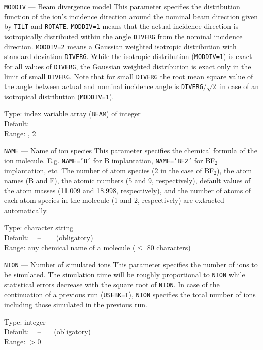 \begin{keydescription}{\texttt{MODDIV} --- Beam divergence model}
%
  This parameter specifies the distribution function of the ion's
  incidence direction around the nominal beam direction given by
  \texttt{TILT} and \texttt{ROTATE}. \texttt{MODDIV=1} means that the
  actual incidence direction is isotropically distributed within the
  angle \texttt{DIVERG} from the nominal incidence direction.
  \texttt{MODDIV=2} means a Gaussian weighted isotropic distribution 
  with standard deviation \texttt{DIVERG}. While the isotropic distribution 
  (\texttt{MODDIV=1}) is exact for all values of \texttt{DIVERG}, the Gaussian
  weighted distribution is exact only in the limit of small \texttt{DIVERG}.
  Note that for small \texttt{DIVERG} the root mean square value of the angle
  between actual and nominal incidence angle is \texttt{DIVERG}$/\sqrt{2}$ in 
  case of an isotropical distribution (\texttt{MODDIV=1}).
%
  \begin{keytab}
    Type:    \> index variable array (\texttt{BEAM}) of integer \\
    Default:  \\
    Range:   , 2
  \end{keytab}
\end{keydescription}

\begin{keydescription}{\texttt{NAME} --- Name of ion species}
%
  This parameter specifies the chemical formula of the ion molecule.
  E.g. \texttt{NAME='B'} for B implantation, \texttt{NAME='BF2'} for
  BF$_2$ implantation, etc.  The number of atom species (2 in the case
  of BF$_2$), the atom names (B and F), the atomic numbers (5 and 9,
  respectively), default values of the atom masses (11.009 and 18.998,
  respectively), and the number of atoms of each atom species in the
  molecule (1 and 2, respectively) are extracted automatically.
%
  \begin{keytab}
    Type:    \> character string \\
    Default: \> ~ -- ~~~ (obligatory) \\
    Range:   \> any chemical name of a molecule ($\le$ 80 characters)
  \end{keytab}
\end{keydescription}

\begin{keydescription}{\texttt{NION} --- Number of simulated ions}
%
  This parameter specifies the number of ions to be simulated. The
  simulation time will be roughly proportional to \texttt{NION} while
  statistical errors decrease with the square root of \texttt{NION}.
  In case of the continuation of a previous run (\texttt{USEBK=T}),
  \texttt{NION} specifies the total number of ions including those
  simulated in the previous run.
%
  \begin{keytab}
    Type:    \> integer \\
    Default: \> ~ -- ~~~(obligatory) \\
    Range:   \> $> 0$
  \end{keytab}
\end{keydescription}


